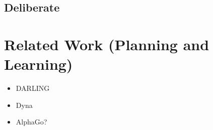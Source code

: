 \subsection{Deliberate}


\section{Related Work (Planning and Learning)}
\begin{itemize}
    \item DARLING
    \item Dyna
    \item AlphaGo?
\end{itemize}